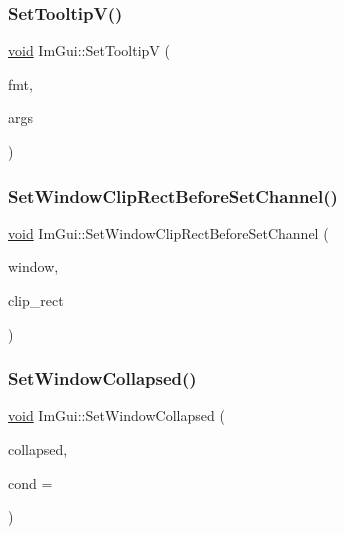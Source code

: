 \mbox{\label{namespaceImGui_a3826acf68fc4a12bb66401575f51d6a2}} 
\subsubsection{\texorpdfstring{Set\+Tooltip\+V()}{SetTooltipV()}}
{\footnotesize\ttfamily \hyperlink{imgui__impl__opengl3__loader_8h_ac668e7cffd9e2e9cfee428b9b2f34fa7}{void} Im\+Gui\+::\+Set\+TooltipV (\begin{DoxyParamCaption}\item[{const char $\ast$}]{fmt,  }\item[{va\+\_\+list}]{args }\end{DoxyParamCaption})}

\mbox{\label{namespaceImGui_a2451c5a6301b6c1234efc8054b70980b}} 
\subsubsection{\texorpdfstring{Set\+Window\+Clip\+Rect\+Before\+Set\+Channel()}{SetWindowClipRectBeforeSetChannel()}}
{\footnotesize\ttfamily \hyperlink{imgui__impl__opengl3__loader_8h_ac668e7cffd9e2e9cfee428b9b2f34fa7}{void} Im\+Gui\+::\+Set\+Window\+Clip\+Rect\+Before\+Set\+Channel (\begin{DoxyParamCaption}\item[{\hyperlink{structImGuiWindow}{Im\+Gui\+Window} $\ast$}]{window,  }\item[{const \hyperlink{structImRect}{Im\+Rect} \&}]{clip\+\_\+rect }\end{DoxyParamCaption})}

\mbox{\label{namespaceImGui_ab5445711a74e0e1a58d1e464cdda252f}} 
\subsubsection{\texorpdfstring{Set\+Window\+Collapsed()}{SetWindowCollapsed()}\hspace{0.1cm}{\footnotesize\ttfamily [1/3]}}
{\footnotesize\ttfamily \hyperlink{imgui__impl__opengl3__loader_8h_ac668e7cffd9e2e9cfee428b9b2f34fa7}{void} Im\+Gui\+::\+Set\+Window\+Collapsed (\begin{DoxyParamCaption}\item[{bool}]{collapsed,  }\item[{Im\+Gui\+Cond}]{cond = {} }\end{DoxyParamCaption})}

